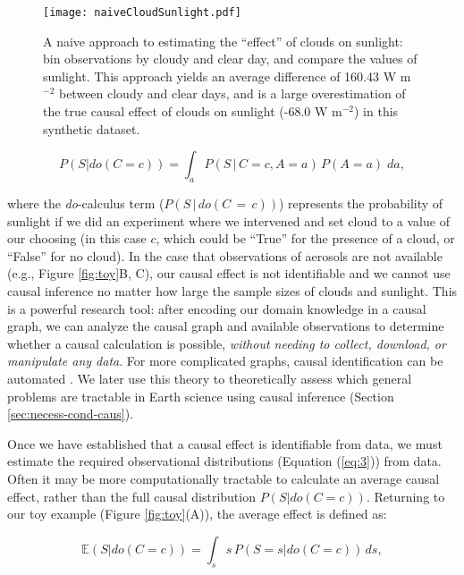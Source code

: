 \documentclass[12pt]{article}
\begin{document}
\begin{figure}
  \texttt{[image: naiveCloudSunlight.pdf]}
  \caption{A naive approach to estimating the ``effect'' of clouds on
    sunlight: bin observations by cloudy and clear day, and compare
    the values of sunlight. This approach yields an average difference
    of 160.43 W m$^{-2}$ between cloudy and clear days, and is a large
    overestimation of the true causal effect of clouds on sunlight
    (-68.0 W m$^{-2}$) in this synthetic dataset.}
  \label{fig:naive-cloud-sunlight}
\end{figure}

\begin{equation}
  P(S | do(C = c)) = \int_{a} P(S \, | \, C = c,
  A=a) \, P(A=a) \; da,
  \label{eq:3}
\end{equation}

where the \textit{do}-calculus \citep{pearl2009} term
($P(S \, | \, do(C\, = \,c))$) represents the probability of sunlight
if we did an experiment where we intervened and set cloud to a value
of our choosing (in this case $c$, which could be ``True'' for the
presence of a cloud, or ``False'' for no cloud). In the case that
observations of aerosols are not available (e.g., Figure
\ref{fig:toy}B, C), our causal effect is not identifiable and we
cannot use causal inference no matter how large the sample sizes of
clouds and sunlight. This is a powerful research tool: after encoding
our domain knowledge in a causal graph, we can analyze the causal
graph and available observations to determine whether a causal
calculation is possible, \textit{without needing to collect, download,
  or manipulate any data}. For more complicated graphs, causal
identification can be automated \citep{shpitser2006}. We later use
this theory to theoretically assess which general problems are
tractable in Earth science using causal inference (Section
\ref{sec:necess-cond-caus}).

Once we have established that a causal effect is identifiable from
data, we must estimate the required observational distributions
(Equation (\ref{eq:3})) from data. Often it may be more computationally
tractable to calculate an average causal effect, rather than the full
causal distribution $P(S | do(C=c))$. Returning to our toy example
(Figure \ref{fig:toy}(A)), the average effect is defined as:

\begin{equation}
  \mathbb{E}(S | do(C = c)) = \int_{s} s \, P(S = s
  | do(C=c)) \, ds,
  \label{eq:4}
\end{equation}
\end{document}
